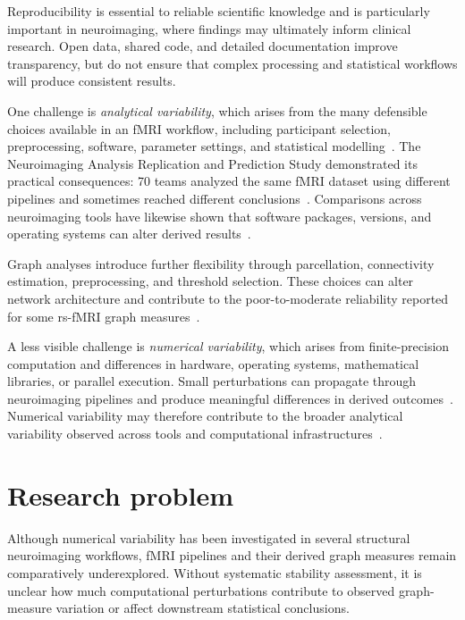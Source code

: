 Reproducibility is essential to reliable scientific knowledge and is particularly important in neuroimaging, where findings may ultimately inform clinical research. Open data, shared code, and detailed documentation improve transparency, but do not ensure that complex processing and statistical workflows will produce consistent results.

One challenge is \emph{analytical variability}, which arises from the many defensible choices available in an fMRI workflow, including participant selection, preprocessing, software, parameter settings, and statistical modelling~\cite{carp2012plurality,li2024moving,germani2025hcp}. The Neuroimaging Analysis Replication and Prediction Study demonstrated its practical consequences: 70 teams analyzed the same fMRI dataset using different pipelines and sometimes reached different conclusions~\cite{botvinik2020variability}. Comparisons across neuroimaging tools have likewise shown that software packages, versions, and operating systems can alter derived results~\cite{Bhagwat2021,Glatard2015}.

Graph analyses introduce further flexibility through parcellation, connectivity estimation, preprocessing, and threshold selection. These choices can alter network architecture and contribute to the poor-to-moderate reliability reported for some rs-fMRI graph measures~\cite{Wang2010Graph,Fornito2010Scaling,Telesford2013Reproducibility}.

A less visible challenge is \emph{numerical variability}, which arises from finite-precision computation and differences in hardware, operating systems, mathematical libraries, or parallel execution. Small perturbations can propagate through neuroimaging pipelines and produce meaningful differences in derived outcomes~\cite{Glatard2015,Salari2021,Kiar2020,chatelain2024numerical}. Numerical variability may therefore contribute to the broader analytical variability observed across tools and computational infrastructures~\cite{kiar2024experimental}.

\section{Research problem}

Although numerical variability has been investigated in several structural neuroimaging workflows, fMRI pipelines and their derived graph measures remain comparatively underexplored. Without systematic stability assessment, it is unclear how much computational perturbations contribute to observed graph-measure variation or affect downstream statistical conclusions.


